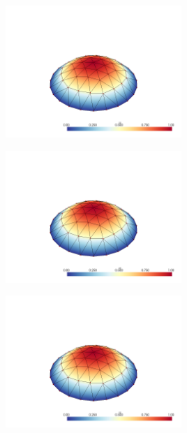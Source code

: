 \documentclass[
  11pt,
]{article}
\let\origfigure\figure
\let\endorigfigure\endfigure
\renewenvironment{figure}[1][2] {
    \expandafter\origfigure\expandafter[H]
} {
    \endorigfigure
}
\begin{document}
\begin{figure}
\centering
\includegraphics[width=0.5\textwidth,height=\textheight]{../img/mesh1-gauss08.png}
\caption{Finite element solution for problem 1 over mesh number 1 and
order-8 numerical integration.}
\end{figure}

\begin{figure}
\centering
\includegraphics[width=0.5\textwidth,height=\textheight]{../img/mesh1-gauss13.png}
\caption{Finite element solution for problem 1 over mesh number 1 and
order-13 numerical integration.}
\end{figure}

\begin{figure}
\centering
\includegraphics[width=0.5\textwidth,height=\textheight]{../img/mesh1-gauss19.png}
\caption{Finite element solution for problem 1 over mesh number 1 and
order-19 numerical integration.}
\end{figure}
\end{document}
